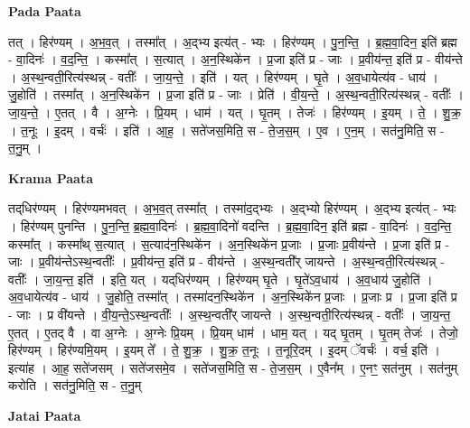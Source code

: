 \documentclass[17pt]{extarticle}
\begin{document}
\textbf{Pada Paata} \newline

तत् । हिर॑ण्यम् । अ॒भ॒व॒त् । तस्मा᳚त् । अ॒द्भ्य इत्य॑त् - भ्यः । हिर॑ण्यम् । पु॒न॒न्ति॒ । ब्र॒ह्म॒वा॒दिन॒ इति॑ ब्रह्म - वा॒दिनः॑ । व॒द॒न्ति॒ । कस्मा᳚त् । स॒त्यात् । अ॒न॒स्थिके॑न । प्र॒जा इति॑ प्र - जाः । प्र॒वीय॑न्त॒ इति॑ प्र - वीय॑न्ते । अ॒स्थ॒न्वती॒रित्य॑स्थन्न् - वतीः᳚ । जा॒य॒न्ते॒ । इति॑ । यत् । हिर॑ण्यम् । घृ॒ते । अ॒व॒धायेत्य॑व - धाय॑ । जु॒होति॑ । तस्मा᳚त् । अ॒न॒स्थिके॑न । प्र॒जा इति॑ प्र - जाः । प्रेति॑ । वी॒य॒न्ते॒ । अ॒स्थ॒न्वती॒रित्य॑स्थन्न् - वतीः᳚ । जा॒य॒न्ते॒ । ए॒तत् । वै । अ॒ग्नेः । प्रि॒यम् । धाम॑ । यत् । घृ॒तम् । तेजः॑ । हिर॑ण्यम् । इ॒यम् । ते॒ । शु॒क्र॒ । त॒नूः । इ॒दम् । वर्चः॑ । इति॑ । आ॒ह॒ । सते॑जस॒मिति॒ स - ते॒ज॒स॒म् । ए॒व । ए॒न॒म् । सत॑नु॒मिति॒ स - त॒नु॒म् ।  \newline


\textbf{Krama Paata} \newline

तद्‌धिर॑ण्यम् । हिर॑ण्यमभवत् । अ॒भ॒व॒त् तस्मा᳚त् । तस्मा॑द॒द्भ्यः । अ॒द्भ्यो हिर॑ण्यम् । अ॒द्भ्य इत्य॑त् - भ्यः । हिर॑ण्यम् पुनन्ति । पु॒न॒न्ति॒ ब्र॒ह्म॒वा॒दिनः॑ । ब्र॒ह्म॒वा॒दिनो॑ वदन्ति । ब्र॒ह्म॒वा॒दिन॒ इति॑ ब्रह्म - वा॒दिनः॑ । व॒द॒न्ति॒ कस्मा᳚त् । कस्मा᳚थ् स॒त्यात् । स॒त्याद॑न॒स्थिके॑न । अ॒न॒स्थिके॑न प्र॒जाः । प्र॒जाः प्र॒वीय॑न्ते । प्र॒जा इति॑ प्र - जाः । प्र॒वीय॑न्तेऽस्थ॒न्वतीः᳚ । प्र॒वीय॑न्त॒ इति॑ प्र - वीय॑न्ते । अ॒स्थ॒न्वती᳚र् जायन्ते । अ॒स्थ॒न्वती॒रित्य॑स्थन्न् - वतीः᳚ । जा॒य॒न्त॒ इति॑ । इति॒ यत् । यद्‌धिर॑ण्यम् । हिर॑ण्यम् घृ॒ते । घृ॒ते॑ऽव॒धाय॑ । अ॒व॒धाय॑ जु॒होति॑ । अ॒व॒धायेत्य॑व - धाय॑ । जु॒होति॒ तस्मा᳚त् । तस्मा॑दन॒स्थिके॑न । अ॒न॒स्थिके॑न प्र॒जाः । प्र॒जाः प्र । प्र॒जा इति॑ प्र - जाः । प्र वी॑यन्ते । वी॒य॒न्ते॒ऽस्थ॒न्वतीः᳚ । अ॒स्थ॒न्वती᳚र् जायन्ते । अ॒स्थ॒न्वती॒रित्य॑स्थन्न् - वतीः᳚ । जा॒य॒न्त॒ ए॒तत् । ए॒तद् वै । वा अ॒ग्नेः । अ॒ग्नेः प्रि॒यम् । प्रि॒यम् धाम॑ । धाम॒ यत् । यद् घृ॒तम् । घृ॒तम् तेजः॑ । तेजो॒ हिर॑ण्यम् । हिर॑ण्यमि॒यम् । इ॒यम् ते᳚ । ते॒ शु॒क्र॒ । शु॒क्र॒ त॒नूः । त॒नूरि॒दम् । इ॒दम् ॅवर्चः॑ । वर्च॒ इति॑ । इत्या॑ह । आ॒ह॒ सते॑जसम् । सते॑जसमे॒व । सते॑जस॒मिति॒ स - ते॒ज॒स॒म् । ए॒वैन᳚म् । ए॒नꣳ॒॒ सत॑नुम् । सत॑नुम् करोति । सत॑नु॒मिति॒ स - त॒नु॒म् \newline

\textbf{Jatai Paata} \newline
\end{document}
